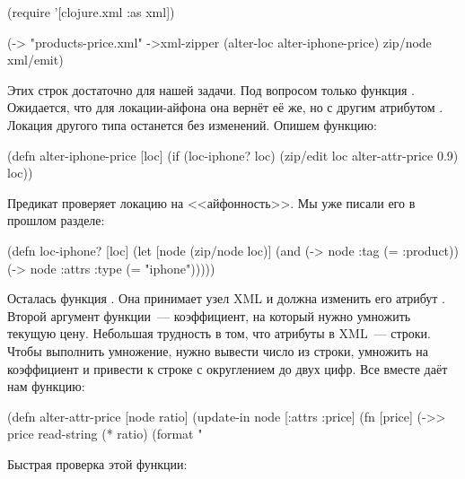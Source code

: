 \begin{english}
  \begin{clojure}
(require '[clojure.xml :as xml])

(-> "products-price.xml"
    ->xml-zipper
    (alter-loc alter-iphone-price)
    zip/node
    xml/emit)
  \end{clojure}
\end{english}

Этих строк достаточно для нашей задачи. Под вопросом только функция
. Ожидается, что для локации-айфона она вернёт её же, но с
другим атрибутом . Локация другого типа останется без изменений. Опишем
функцию:

\begin{english}
  \begin{clojure}
(defn alter-iphone-price
  [loc]
  (if (loc-iphone? loc)
    (zip/edit loc alter-attr-price 0.9)
    loc))
  \end{clojure}
\end{english}

Предикат  проверяет локацию на <<айфонность>>. Мы уже писали его в
прошлом разделе:

\begin{english}
  \begin{clojure}
(defn loc-iphone? [loc]
  (let [node (zip/node loc)]
    (and (-> node :tag (= :product))
         (-> node :attrs :type (= "iphone")))))
  \end{clojure}
\end{english}

Осталась функция . Она принимает узел XML и должна
изменить его атрибут . Второй аргумент функции~--- коэффициент, на
который нужно умножить текущую цену. Небольшая трудность в том, что атрибуты в
XML~--- строки. Чтобы выполнить умножение, нужно вывести число из строки,
умножить на коэффициент и привести к строке с округлением до двух цифр. Все
вместе даёт нам функцию:

\begin{english}
  \begin{clojure}
(defn alter-attr-price [node ratio]
  (update-in node [:attrs :price]
             (fn [price]
               (->> price
                    read-string
                    (* ratio)
                    (format "%
  \end{clojure}
\end{english}

Быстрая проверка этой функции:


